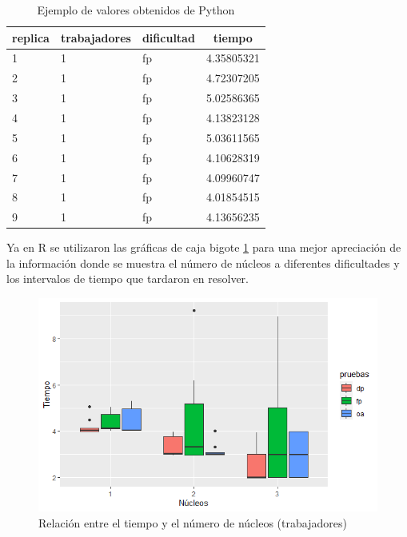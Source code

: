\documentclass{article}
\begin{document}
\begin{table}[h!]
\begin{center}
\caption{Ejemplo de valores obtenidos de Python}
\label{tabla1}
\begin{tabular}{|l|l|l|l|}
\hline
\multicolumn{1}{|c|}{\textbf{replica}} & \multicolumn{1}{c|}{\textbf{trabajadores}} & \multicolumn{1}{c|}{\textbf{dificultad}} & \multicolumn{1}{c|}{\textbf{tiempo}} \\ \hline
1 & 1 & fp & 4.35805321 \\ \hline
2 & 1 & fp & 4.72307205 \\ \hline
3 & 1 & fp & 5.02586365 \\ \hline
4 & 1 & fp & 4.13823128 \\ \hline
5 & 1 & fp & 5.03611565 \\ \hline
6 & 1 & fp & 4.10628319 \\ \hline
7 & 1 & fp & 4.09960747 \\ \hline
8 & 1 & fp & 4.01854515 \\ \hline
9 & 1 & fp & 4.13656235 \\ \hline
\end{tabular}
\end{center}
\end{table}

Ya en R se utilizaron las gráficas de caja bigote \ref{grafica1} para una mejor apreciación de la información donde se muestra el número de núcleos a diferentes dificultades y los intervalos de tiempo que tardaron en resolver.

\begin{figure} [h!]%
\renewcommand{\figurename}{Grafica}
    \centering
    \caption{Relación entre el tiempo y el número de núcleos (trabajadores)}
    \label{grafica1}
    \includegraphics[width=120mm]{grafica1.png} %
\end{figure}
\end{document}
